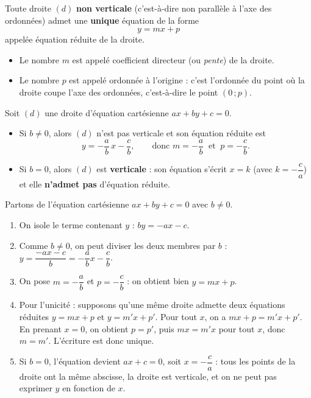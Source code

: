 \documentclass[11pt]{article}
\newcommand{\cle}[1]{{\popxbold\color{popdark}#1}}
\begin{document}
\begin{definition}
Toute droite $(d)$ \textbf{non verticale} (c'est-à-dire non parallèle à l'axe des ordonnées) admet une \textbf{unique} équation de la forme
\[ y = mx + p \]
appelée \cle{équation réduite} de la droite.
\begin{itemize}
\item Le nombre $m$ est appelé \cle{coefficient directeur} (ou \emph{pente}) de la droite.
\item Le nombre $p$ est appelé \cle{ordonnée à l'origine} : c'est l'ordonnée du point où la droite coupe l'axe des ordonnées, c'est-à-dire le point $(0\,; p)$.
\end{itemize}
\end{definition}

\begin{propriete}
Soit $(d)$ une droite d'équation cartésienne $ax + by + c = 0$.
\begin{itemize}
\item Si $b \neq 0$, alors $(d)$ n'est pas verticale et son équation réduite est
\[ y = -\dfrac{a}{b}\,x - \dfrac{c}{b}, \qquad \text{donc } m = -\dfrac{a}{b} \ \text{ et } \ p = -\dfrac{c}{b}. \]
\item Si $b = 0$, alors $(d)$ est \textbf{verticale} : son équation s'écrit $x = k$ (avec $k = -\dfrac{c}{a}$) et elle \textbf{n'admet pas} d'équation réduite.
\end{itemize}
\end{propriete}

\begin{experience}
Partons de l'équation cartésienne $ax + by + c = 0$ avec $b \neq 0$.
\begin{enumerate}
\item On isole le terme contenant $y$ : $by = -ax - c$.
\item Comme $b \neq 0$, on peut diviser les deux membres par $b$ : $y = \dfrac{-ax - c}{b} = -\dfrac{a}{b}x - \dfrac{c}{b}$.
\item On pose $m = -\dfrac{a}{b}$ et $p = -\dfrac{c}{b}$ : on obtient bien $y = mx + p$.
\item Pour l'unicité : supposons qu'une même droite admette deux équations réduites $y = mx + p$ et $y = m'x + p'$. Pour tout $x$, on a $mx + p = m'x + p'$. En prenant $x = 0$, on obtient $p = p'$, puis $mx = m'x$ pour tout $x$, donc $m = m'$. L'écriture est donc unique.
\item Si $b = 0$, l'équation devient $ax + c = 0$, soit $x = -\dfrac{c}{a}$ : tous les points de la droite ont la même abscisse, la droite est verticale, et on ne peut pas exprimer $y$ en fonction de $x$.
\end{enumerate}
\end{experience}
\end{document}
